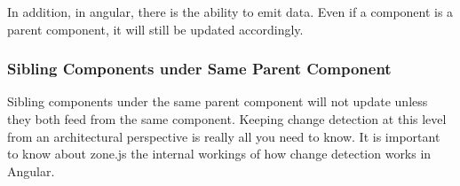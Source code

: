 In addition, in angular, there is the ability to emit data. Even if a component
is a parent component, it will still be updated accordingly.

\subsubsection{ Sibling Components under Same Parent Component }
Sibling components under the same parent component will not update unless they
both feed from the same component. Keeping change detection at this level
from an architectural perspective is really all you need to know. It is
important to know about zone.js the internal workings of how change detection
works in Angular. 
